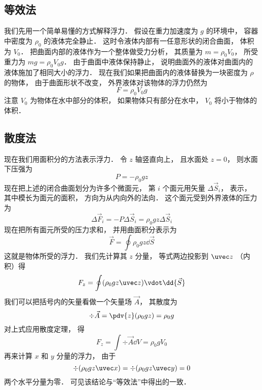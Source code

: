 
\subsection{等效法}

我们先用一个简单易懂的方式解释浮力． 假设在重力加速度为 $g$ 的环境中， 容器中密度为 $\rho_0$ 的液体完全静止． 这时令液体内部有一任意形状的闭合曲面， 体积为 $V_0$． 把曲面内部的液体作为一个整体做受力分析， 其质量为 $m = \rho_0 V_0$， 所受重力为 $mg = \rho_0 V_0 g$． 由于曲面中液体保持静止， 说明曲面外的液体对曲面内的液体施加了相同大小的浮力． 现在我们如果把曲面内的液体替换为一块密度为 $\rho$ 的物体， 由于曲面形状不改变， 外界液体对该物体的浮力仍然为
\begin{equation}
F = \rho_0 V_0 g
\end{equation}
注意 $V_0$ 为物体在水中部分的体积， 如果物体只有部分在水中， $V_0$ 将小于物体的体积．

\subsection{散度法}

现在我们用面积分的方法表示浮力． 令 $z$ 轴竖直向上， 且水面处 $z = 0$， 则水面下压强为
\begin{equation}
P = -\rho_0 g z
\end{equation}
现在把上述的闭合曲面划分为许多个微面元， 第 $i$ 个面元用矢量 $\Delta \vec S_i$， 表示， 其中模长为面元的面积， 方向为从内向外的法向． 这个面元受到外界液体的压力为
\begin{equation}
\Delta \vec F_i = -P\Delta \vec S_i = \rho_0 g z \Delta \vec S_i
\end{equation}
现在把所有面元所受的压力求和， 并用曲面积分表示为
\begin{equation}
\vec F = \oint \rho_0 g z \dd{\vec S}
\end{equation}
这就是物体所受的浮力． 我们先计算其 $z$ 分量， 等式两边投影到 $\uvec z$ （内积）得
\begin{equation}
F_z = \oint (\rho_0 g z \uvec z)\vdot \dd{\vec S}
\end{equation}
我们可以把括号内的矢量看做一个矢量场 $\vec A$， 其散度为
\begin{equation}
\div \vec A = \pdv{z}(\rho_0 g z) = \rho_0 g
\end{equation}
对上式应用散度定理， 得
\begin{equation}
F_z = \int \div\vec A \dd{V} = \rho_0 g V_0
\end{equation}
再来计算 $x$ 和 $y$ 分量的浮力， 由于
\begin{equation}
\div (\rho_0 g z\uvec x) = \div (\rho_0 g z\uvec y) = 0
\end{equation}
两个水平分量为零． 可见该结论与“等效法”中得出的一致．


